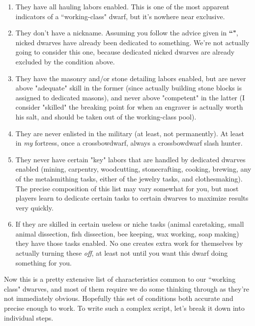 \documentclass[]{article}
\begin{document}
\begin{enumerate}
\item They have all hauling labors enabled. This is one of the most apparent indicators of a
``working-class" dwarf, but it's nowhere near exclusive.

\item They don't have a nickname. Assuming you follow the advice given in
\textbf{``"}, nicked dwarves have already been dedicated to something.
We're not actually going to consider this one, because dedicated nicked dwarves are already excluded by
the condition above.

\item They have the masonry and/or stone detailing labors enabled, but are never above "adequate" skill
in the former (since actually building stone blocks is assigned to dedicated masons), and never above
"competent" in the latter (I consider "skilled" the breaking point for when an engraver is actually worth
his salt, and should be taken out of the working-class pool).

\item They are never enlisted in the military (at least, not permanently). At least in \emph{my}
fortress, once a crossbowdwarf, always a crossbowdwarf slash hunter.

\item They never have certain "key" labors that are handled by dedicated dwarves enabled (mining,
carpentry, woodcutting, stonecrafting, cooking, brewing, any of the metalsmithing tasks, either of the
jewelry tasks, and clothesmaking). The precise composition of this list may vary somewhat for you, but
most players learn to dedicate certain tasks to certain dwarves to maximize results very quickly.

\item If they are skilled in certain useless or niche tasks (animal caretaking, small animal dissection,
fish dissection, bee keeping, wax working, soap making) they have those tasks enabled. No one creates
extra work for themselves by actually turning these \emph{off}, at least not until you want this dwarf
doing something for you.

\end{enumerate}

Now this is a pretty extensive list of characteristics common to our ``working class" dwarves, and most
of them require we do some thinking through as they're not immediately obvious.
Hopefully this set of conditions both accurate and precise enough to work. To write such a complex
script, let's break it down into individual steps.
\vspace{12pt}
\end{document}
